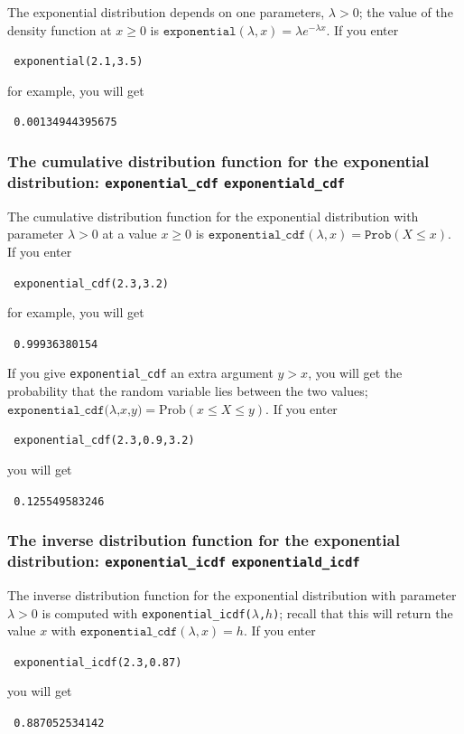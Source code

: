 \documentclass[a4paper,11pt]{book}
\begin{document}
The exponential distribution depends on one parameters, $\lambda>0$; the
value of the density function at $x \ge 0$ is
$\texttt{exponential}(\lambda,x) =
\lambda e^{-\lambda x}$.  If you enter
\begin{center}
  \tt
  exponential(2.1,3.5)
\end{center}
for example, you will get
\begin{center}
  \tt
  0.00134944395675
\end{center}

\subsubsection{The cumulative distribution function for the exponential distribution: \texttt{exponential\_cdf} \texttt{exponentiald\_cdf}}

The cumulative distribution function for the exponential distribution with
parameter $\lambda > 0$  at a value $x \ge 0$  is
$\texttt{exponential\_cdf}(\lambda,x) = \texttt{Prob}(X \le x)$.
If you enter
\begin{center}
  \tt
  exponential\_cdf(2.3,3.2)
\end{center}
for example, you will get
\begin{center}
  \tt
  0.99936380154
\end{center}

If you give \texttt{exponential\_cdf} an extra argument $y > x$,
you will get the probability that
the random variable lies between the two values;
$\texttt{exponential\_cdf($\lambda$,$x$,$y$)} = \text{Prob}(x \le X \le y)$.  
If you enter
\begin{center}
  \tt
  exponential\_cdf(2.3,0.9,3.2)
\end{center}
you will get
\begin{center}
  \tt
  0.125549583246
\end{center}

\subsubsection{The inverse distribution function for the exponential distribution: \texttt{exponential\_icdf} \texttt{exponentiald\_icdf}}

The inverse distribution function for the exponential
distribution with parameter $\lambda > 0$ is computed with
\texttt{exponential\_icdf($\lambda$,$h$)}; recall that this will return the
value $x$ with $\texttt{exponential\_cdf}(\lambda,x) = h$.  If you enter
\begin{center}
  \tt
  exponential\_icdf(2.3,0.87)
\end{center}
you will get
\begin{center}
  \tt
  0.887052534142
\end{center}
\end{document}

